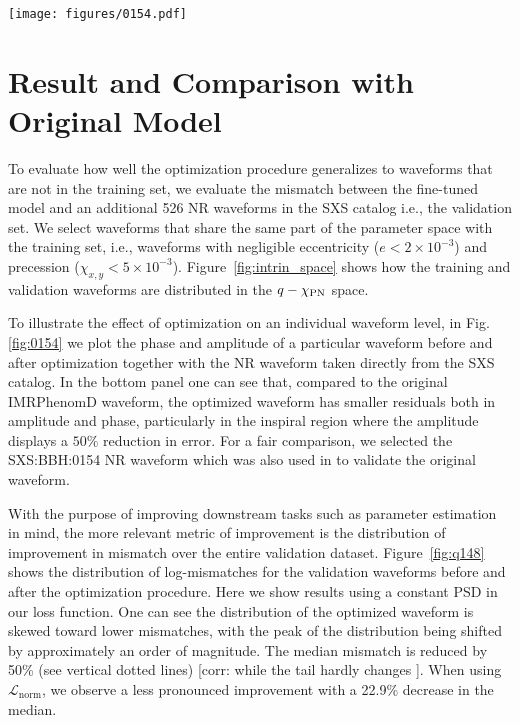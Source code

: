 \documentclass[twocolumn]{aastex631}
\newcommand{\corr}[1]{{\color{red}[corr: #1 ]}}
\begin{document}
\begin{figure*}[t]
	\centering
	\texttt{[image: figures/0154.pdf]}
	\caption{Comparison between original and optimized IMRPhenomD waveforms.
	Here we show the SXS:BBH:0154 NR waveform, which has a mass ratio of $q=1$ and spins
	$\chi_1=\chi_2=-0.8$. The original mismatch is $2.8\times10^{-4}$ and
	the optimized mismatch is $5.3\times10^{-5}$. \textit{Top}: Here we show the
	amplitude (left) and phase (right) of the NR, original IMRPhenomD, and optimized IMRPhenomD
	waveforms. \textit{Bottom}: Here we show the relative error between the NR and
	IMRPhenomD waveform ampltiudes (left) as well as the absolute error of the phases between the NR and
	IMRPhenomD waveforms (right).}
	\label{fig:0154}
\end{figure*}

\section{Result and Comparison with Original Model} \label{sec:result}

To evaluate how well the optimization procedure generalizes to waveforms that are
not in the training set, we evaluate the mismatch between the fine-tuned model
and an additional 526 NR waveforms in the SXS catalog i.e., the validation set.
We select waveforms that share the same part of the parameter space with the training
set, i.e., waveforms with negligible eccentricity (${e<2\times10^{-3}}$)
and precession (${\chi_{x,y}<5\times10^{-3}}$). Figure~\ref{fig:intrin_space}
shows how the training and validation waveforms are distributed in the
$q-\chi_{\rm PN}$ space.

To illustrate the effect of optimization on an individual waveform level, in Fig.
\ref{fig:0154} we plot the phase and amplitude of a particular waveform before and after optimization together with
the NR waveform taken directly from the SXS catalog. In the bottom panel one can see that,
compared to the original IMRPhenomD waveform, the optimized waveform has smaller residuals both in amplitude and
phase, particularly in the inspiral region where the amplitude displays a
$50\%$ reduction in error. For a fair comparison, we selected the SXS:BBH:0154 NR waveform
which was also used in \citep{khan2016frequency} to validate the original waveform.

With the purpose of improving downstream tasks such as parameter estimation in
mind, the more relevant metric of improvement is the distribution of improvement
in mismatch over the entire validation dataset. Figure~\ref{fig:q148} shows the
distribution of log-mismatches for the validation waveforms before and after the
optimization procedure. Here we show results using a constant PSD in our loss
function. One can see the distribution of the optimized waveform is skewed toward lower mismatches,
with the peak of the distribution being shifted by approximately an order of
magnitude. The median mismatch is reduced by 50\% (see vertical dotted lines) \corr{while the tail hardly changes}. When using
$\mathcal{L}_{\mathrm{norm}}$, we observe a less pronounced improvement with a 22.9\%
decrease in the median. 
\end{document}
